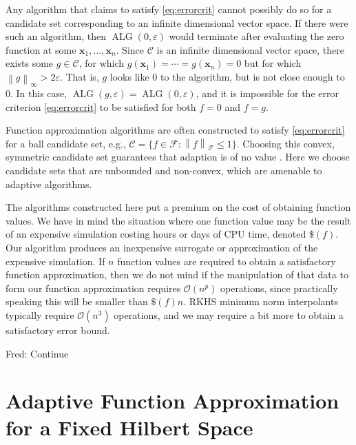 \documentclass[]{mcom-l}
\theoremstyle{remark}
\DeclareMathOperator{\ALG}{ALG}
\newcommand{\bx}{{\boldsymbol{x}}}
\newcommand{\cc}{\mathcal{C}}
\newcommand{\calf}{{\mathcal{F}}}
\newcommand{\norm}[2][{}]{\ensuremath{\left \lVert #2 \right \rVert}_{#1}}
\newcommand{\Order}{\mathcal{O}}
\newcommand{\FredNote}[1]{{\color{blue}Fred: #1}}
\begin{document}
Any algorithm that claims to satisfy \eqref{eq:errorcrit} cannot possibly do so for a candidate set corresponding to an infinite dimensional vector space.  If there were such an algorithm, then $\ALG(0,\varepsilon)$ would terminate after evaluating the zero function at some $\bx_1, \ldots, \bx_n$.  Since $\cc$ is an infinite dimensional vector space, there exists some $g \in \cc$, for which $g(\bx_1) = \cdots = g(\bx_n) = 0$ but for which $\norm[\infty]{g} > 2 \varepsilon$.  That is, $g$ looks like $0$ to the algorithm, but is not close enough to $0$.  In this case, $\ALG(g,\varepsilon) = \ALG(0,\varepsilon)$, and it is impossible for the error criterion \eqref{eq:errorcrit} to be satisfied for both $f=0$ and $f = g$.

Function approximation algorithms are often constructed to satisfy \eqref{eq:errorcrit} for a ball candidate set, e.g., $\cc = \{f \in \calf : \norm[\calf]{f} \le 1\}$.  Choosing this convex, symmetric  candidate set guarantees that adaption is of no value \cite{Bak71}.  Here we choose candidate sets that are unbounded and non-convex, which are amenable to adaptive algorithms.

The algorithms constructed here put a premium on the cost of obtaining function values.  We have in mind the situation where one function value may be the result of an expensive simulation costing hours or days of CPU time, denoted $\$(f)$.  Our algorithm produces an inexpensive surrogate or approximation of the expensive simulation.  If $n$ function values are required to obtain a satisfactory function approximation, then we do not mind if the manipulation of that data to form our function approximation requires $\Order(n^p)$ operations, since practically speaking this will be smaller than $\$(f) n$.  RKHS minimum  norm interpolants typically require $\Order(n^3)$ operations, and we may require a bit more to obtain a satisfactory error bound.


\FredNote{Continue}


\section{Adaptive Function Approximation for a Fixed Hilbert Space} \label{sec:fixedF}
\end{document}
